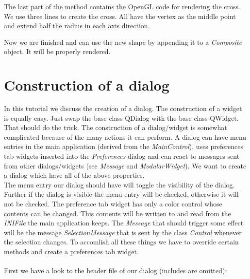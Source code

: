 The last part of the method contains the OpenGL code for rendering the cross.
We use three lines to create the cross. All have the vertex as the middle point
and extend half the radius in each axis direction.

Now we are finished and can use the new shape by appending it to a {\em Composite}
object. It will be properly rendered.


\section{Construction of a dialog}
\label{section:view_construction_of_a_dialog}

In this tutorial we discuss the creation of a dialog. The construction of a widget
is equally easy. Just swap the base class QDialog with the base class QWidget.
That should do the trick.
The construction of a dialog/widget is somewhat complicated because of the many
actions it can perform.
A dialog can have menu entries in the main application (derived from the {\em MainControl}),
uses preferences tab widgets inserted into the {\em Preferences} dialog and can react to
messages sent from other dialogs/widgets (see {\em Message} and {\em ModularWidget}).
We want to create a dialog which have all of the above properties.\\
The menu entry our dialog should have will toggle the visibility of the dialog. Further
if the dialog is visible the menu entry will be checked, otherwise it will not be checked.
The preference tab widget has only a color control whose contents can be changed. This contents
will be written to and read from the {\em INIFile} the main application keeps.
The {\em Message} that should trigger some effect will be the message {\em SelectionMessage}
that is sent by the class {\em Control} whenever the selection changes.
To accomlish all these things we have to override certain methods and create a preferences tab
widget.\\ \\
First we have a look to the header file of our dialog (includes are omitted):

